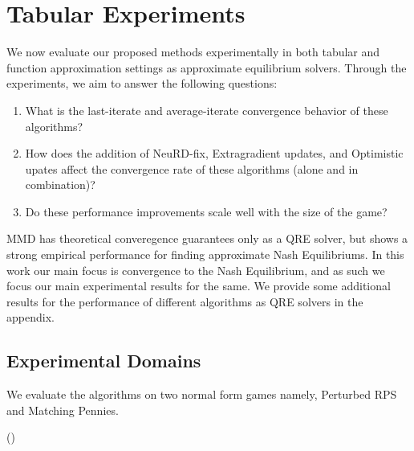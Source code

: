 \chapter{Tabular Experiments}

We now evaluate our proposed methods experimentally in both tabular and function approximation
settings as approximate equilibrium solvers.
Through the experiments, we aim to answer the following questions:
\begin{enumerate}
	\item {What is
	      the last-iterate and average-iterate convergence behavior of these algorithms?
	      }\label{qn1}
	\item {How does the addition of NeuRD-fix, Extragradient updates, and Optimistic upates
	      affect the convergence rate of these algorithms (alone and in combination)?}\label{qn2}
	\item {Do these performance improvements scale well with the size of the game?}\label{qn3}
\end{enumerate}

MMD has theoretical converegence guarantees only as a QRE solver, but shows a strong empirical
performance for finding approximate Nash Equilibriums.
In this work our main focus is convergence to the Nash Equilibrium, and as such we focus our main
experimental results for the same.
We provide some additional results for the performance of different algorithms as QRE solvers in
the appendix.

\section{Experimental Domains}
We evaluate the algorithms on two normal form games namely, Perturbed RPS and Matching Pennies.

()

